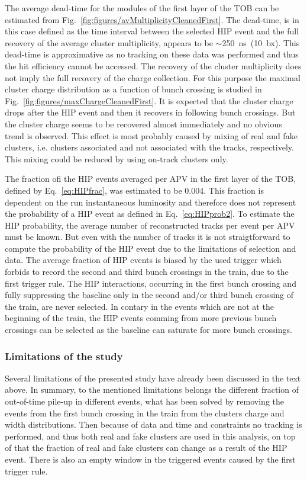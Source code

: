 The average dead-time for the modules of the first layer of the TOB can be estimated from Fig.~\ref{fig:figures/avMultiplicityCleanedFirst}. The dead-time, is in this case defined as the time interval between the selected HIP event and the full recovery of the average cluster multiplicity, appears to be $\sim$250~ns~(10~bx). This dead-time is approximative as no tracking on these data was performed and thus the hit efficiency cannot be accessed. The recovery of the cluster multiplicity does not imply the full recovery of the charge collection. For this purpose the maximal cluster charge distribution as a function of bunch crossing is studied in Fig.~\ref{fig:figures/maxChargeCleanedFirst}. It is expected that the cluster charge drops after the HIP event and then it recovers in following bunch crossings. But the cluster charge seems to be recovered almost immediately and no obvious trend is observed. This effect is most probably caused by mixing of real and fake clusters, i.e. clusters associated and not associated with the tracks, respectively. This mixing could be reduced by using on-track clusters only.

The fraction ofi the HIP events averaged per APV in the first layer of the TOB, defined by Eq.~\ref{eq:HIPfrac}, was estimated to be 0.004. This fraction is dependent on the run instantaneous luminosity and therefore does not represent the probability of a HIP event as defined in Eq.~\ref{eq:HIPprob2}. To estimate the HIP probability, the average number of reconstructed tracks per event per APV must be known. But even with the number of tracks it is not straigtforward to compute the probability of the HIP event due to the limitations of selection and data. The average fraction of HIP events is biased by the used trigger which forbids to record the second and third bunch crossings in the train, due to the first trigger rule. The HIP interactions, occurring in the first bunch crossing and fully suppressing the baseline only in the second and/or third bunch crossing of the train, are never selected. In contary in the events which are not at the beginning of the train, the HIP events comming from more previous bunch crossings can be selected as the baseline can saturate for more bunch crossings.
 

\subsubsection{Limitations of the study~\label{sec:limitationsSelection}}

Several limitations of the presented study have already been discussed in the text above. In summary, to the mentioned limitations belongs the different fraction of out-of-time pile-up in different events, what has been solved by removing the events from the first bunch crossing in the train from the clusters charge and width distributions. Then because of data and time and constraints no tracking is performed, and thus both real and fake clusters are used in this analysis, on top of that the fraction of real and fake clusters can change as a result of the HIP event. There is also an empty window in the triggered events caused by the first trigger rule.

